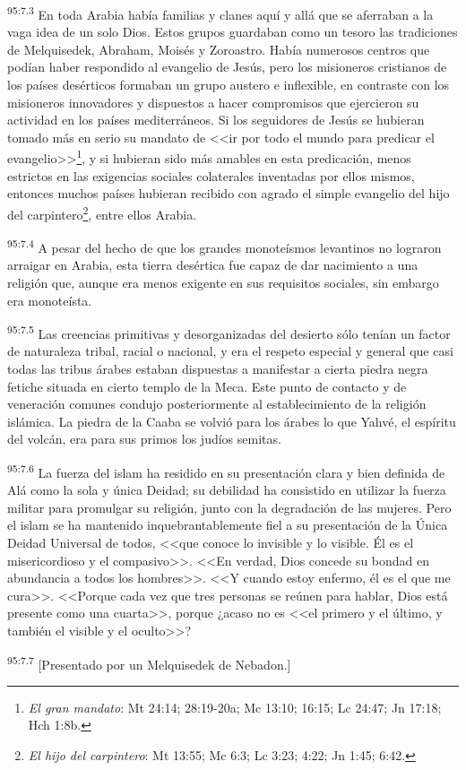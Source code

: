 \par
\textsuperscript{95:7.3} En toda Arabia había familias y clanes aquí y allá que se aferraban a la vaga idea de un solo Dios. Estos grupos guardaban como un tesoro las tradiciones de Melquisedek, Abraham, Moisés y Zoroastro. Había numerosos centros que podían haber respondido al evangelio de Jesús, pero los misioneros cristianos de los países desérticos formaban un grupo austero e inflexible, en contraste con los misioneros innovadores y dispuestos a hacer compromisos que ejercieron su actividad en los países mediterráneos. Si los seguidores de Jesús se hubieran tomado más en serio su mandato de <<ir por todo el mundo para predicar el evangelio>>\footnote{\textit{El gran mandato}: Mt 24:14; 28:19-20a; Mc 13:10; 16:15; Lc 24:47; Jn 17:18; Hch 1:8b.}, y si hubieran sido más amables en esta predicación, menos estrictos en las exigencias sociales colaterales inventadas por ellos mismos, entonces muchos países hubieran recibido con agrado el simple evangelio del hijo del carpintero\footnote{\textit{El hijo del carpintero}: Mt 13:55; Mc 6:3; Lc 3:23; 4:22; Jn 1:45; 6:42.}, entre ellos Arabia.

\par
\textsuperscript{95:7.4} A pesar del hecho de que los grandes monoteísmos levantinos no lograron arraigar en Arabia, esta tierra desértica fue capaz de dar nacimiento a una religión que, aunque era menos exigente en sus requisitos sociales, sin embargo era monoteísta.

\par
\textsuperscript{95:7.5} Las creencias primitivas y desorganizadas del desierto sólo tenían un factor de naturaleza tribal, racial o nacional, y era el respeto especial y general que casi todas las tribus árabes estaban dispuestas a manifestar a cierta piedra negra fetiche situada en cierto templo de la Meca. Este punto de contacto y de veneración comunes condujo posteriormente al establecimiento de la religión islámica. La piedra de la Caaba se volvió para los árabes lo que Yahvé, el espíritu del volcán, era para sus primos los judíos semitas.

\par
\textsuperscript{95:7.6} La fuerza del islam ha residido en su presentación clara y bien definida de Alá como la sola y única Deidad; su debilidad ha consistido en utilizar la fuerza militar para promulgar su religión, junto con la degradación de las mujeres. Pero el islam se ha mantenido inquebrantablemente fiel a su presentación de la Única Deidad Universal de todos, <<que conoce lo invisible y lo visible.
Él es el misericordioso y el compasivo>>. <<En verdad, Dios concede su bondad en abundancia a todos los hombres>>. <<Y cuando estoy enfermo, él es el que me cura>>. <<Porque cada vez que tres personas se reúnen para hablar, Dios está presente como una cuarta>>, porque ¿acaso no es <<el primero y el último, y también el visible y el oculto>>?

\par
\textsuperscript{95:7.7} [Presentado por un Melquisedek de Nebadon.]